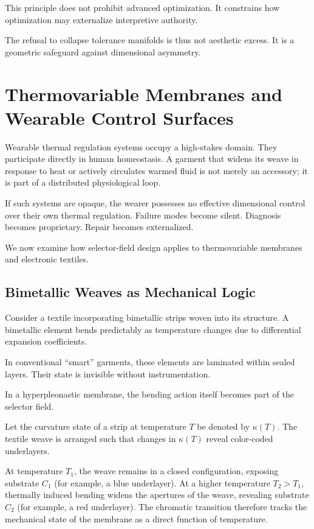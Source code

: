 \documentclass[11pt]{article}
\begin{document}
\medskip

This principle does not prohibit advanced optimization. It constrains 
how optimization may externalize interpretive authority.

The refusal to collapse tolerance manifolds is thus not aesthetic excess. 
It is a geometric safeguard against dimensional asymmetry.

\section{Thermovariable Membranes and Wearable Control Surfaces}

Wearable thermal regulation systems occupy a high-stakes domain. 
They participate directly in human homeostasis. A garment that widens 
its weave in response to heat or actively circulates warmed fluid 
is not merely an accessory; it is part of a distributed physiological loop.

If such systems are opaque, the wearer possesses no effective 
dimensional control over their own thermal regulation. Failure 
modes become silent. Diagnosis becomes proprietary. Repair becomes 
externalized.

We now examine how selector-field design applies to thermovariable 
membranes and electronic textiles.

\subsection{Bimetallic Weaves as Mechanical Logic}

Consider a textile incorporating bimetallic strips woven into its 
structure. A bimetallic element bends predictably as temperature 
changes due to differential expansion coefficients.

In conventional ``smart'' garments, these elements are laminated 
within sealed layers. Their state is invisible without instrumentation.

In a hyperpleonastic membrane, the bending action itself becomes 
part of the selector field.

Let the curvature state of a strip at temperature $T$ be denoted 
by $\kappa(T)$. The textile weave is arranged such that changes in 
$\kappa(T)$ reveal color-coded underlayers.

At temperature $T_1$, the weave remains in a closed configuration,
exposing substrate $C_1$ (for example, a blue underlayer). At a higher
temperature $T_2 > T_1$, thermally induced bending widens the apertures
of the weave, revealing substrate $C_2$ (for example, a red underlayer).
The chromatic transition therefore tracks the mechanical state of the
membrane as a direct function of temperature.
\end{document}
